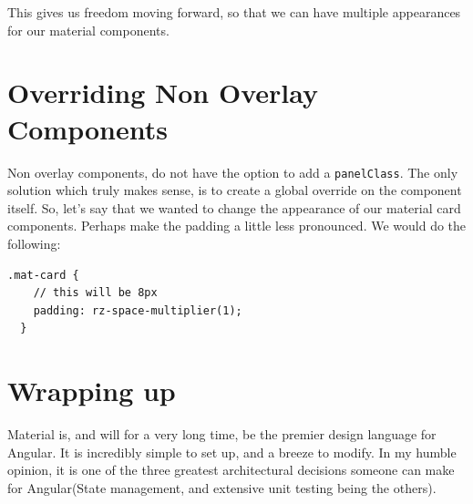 This gives us freedom moving forward, so that we can have multiple appearances
for our material components.

\section{Overriding Non Overlay Components}
Non overlay components, do not have the option to add a \lstinline{panelClass}.
The only solution which truly makes sense, is to create a global override on
the component itself. So, let's say that we wanted to change the appearance of
our material card components. Perhaps make the padding a little less pronounced.
We would do the following: 
\begin{lstlisting}[caption=\_mat-card.scss override]
  .mat-card {
    // this will be 8px
    padding: rz-space-multiplier(1);
  }
\end{lstlisting}

\section{Wrapping up}
Material is, and will for a very long time, be the premier design language for
Angular. It is incredibly simple to set up, and a breeze to modify. In my humble 
opinion, it is one of the three greatest architectural decisions someone can make 
for Angular(State management, and extensive unit testing being the others).

